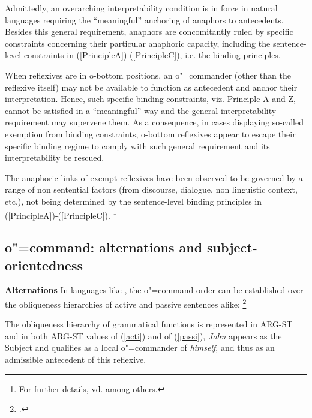 \documentclass[output=paper
	        ,collection
	        ,collectionchapter
 	        ,biblatex
                ,babelshorthands
                ,newtxmath
                ,draftmode
                ,colorlinks, citecolor=brown
]{langscibook}
\begin{document}
Admittedly, an overarching interpretability condition is in force in natural languages
requiring the ``meaningful'' anchoring of anaphors to antecedents. Besides this general 
requirement, anaphors are concomitantly ruled by specific constraints concerning their 
particular anaphoric capacity, including the sentence-level constraints in (\ref{PrincipleA})-(\ref{PrincipleC}), i.e. the binding principles.

When reflexives are in o-bottom positions, an o"=commander (other than the reflexive itself) may not be
available to function as antecedent and anchor their interpretation. Hence, such specific
binding constraints, viz. Principle A and Z, cannot be satisfied in a ``meaningful'' way and the general
interpretability requirement may supervene them. As a consequence, in cases displaying so-called
exemption from binding constraints, o-bottom reflexives appear to escape their specific binding regime
to comply with such general requirement and its interpretability be rescued. 

The anaphoric links of exempt reflexives have been observed to be
governed by a range of non sentential factors (from discourse, dialogue, non linguistic context,
etc.), not being determined by the sentence-level binding principles in (\ref{PrincipleA})-(\ref{PrincipleC}).%
%
\footnote{For further details, vd. \citep{kuno:func87, zribi:pview89, golde:diss99} among others.
} 


\subsection{o"=command: alternations and subject-orientedness}\label{ocommand}

\textbf{Alternations} In languages like , the o"=command order can be established over the
obliqueness hierarchies of active and passive sentences alike:%
%
\footnote{
\citep{Jackendoff72a-u, polsag:hpsg94}.}


\begin{exe}
\ex
\begin{xlist}
\label{acti}
\label{passi}
\end{xlist}
\end{exe}

The obliqueness hierarchy of grammatical functions is represented in ARG-ST 
and in both ARG-ST values of (\ref{acti}) and of (\ref{passi}), {\em John}
appears as the Subject and qualifies as a local o"=commander of {\em himself},
and thus as an admissible antecedent of this reflexive.
\end{document}
